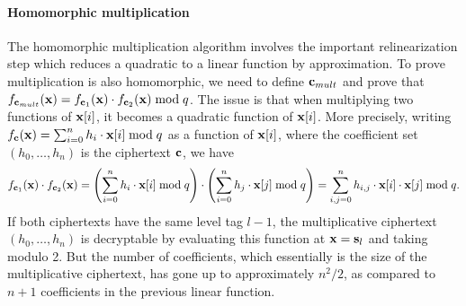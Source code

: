 \documentclass[../main.tex]{subfiles}
\begin{document}
\paragraph{Homomorphic multiplication} 
The homomorphic multiplication algorithm involves the important relinearization step which reduces a quadratic to a linear function by approximation. To prove multiplication is also homomorphic, we need to define $\mathbf{c}_{mult}$ and prove that $f_{\mathbf{c}_{mult}}(\mathbf{x})=f_{\mathbf{c}_1}(\mathbf{x}) \cdot f_{\mathbf{c}_2}(\mathbf{x}) \bmod q$. The issue is that when multiplying two functions of $\mathbf{x}[i]$, it becomes a quadratic function of $\mathbf{x}[i]$. More precisely, writing $f_{\mathbf{c}}(\mathbf{x}) = \sum_{i=0}^n h_i \cdot \mathbf{x}[i] \bmod q$ as a function of $\mathbf{x}[i]$, where the coefficient set $(h_0, \dots, h_n)$ is the ciphertext $\mathbf{c}$, we have %
\begin{align}
\label{eq:homoMultQuad}
    f_{\mathbf{c}_1}(\mathbf{x}) \cdot f_{\mathbf{c}_2}(\mathbf{x}) 
    = \left(\sum_{i=0}^n h_i \cdot \mathbf{x}[i] \bmod q \right) \cdot \left(\sum_{i=0}^n h_j \cdot \mathbf{x}[j] \bmod q \right)  
    = \sum_{i,j=0}^n h_{i,j} \cdot \mathbf{x}[i] \cdot \mathbf{x}[j] \bmod q.
\end{align}
If both ciphertexts have the same level tag $l-1$, the multiplicative ciphertext $(h_0, \dots, h_n)$ is decryptable by evaluating this function at $\mathbf{x}=\mathbf{s}_l$ and taking modulo 2. But the number of coefficients, which essentially is the size of the multiplicative ciphertext, has gone up to approximately $n^2/2$, as compared to $n+1$ coefficients in the previous linear function. 
\end{document}
